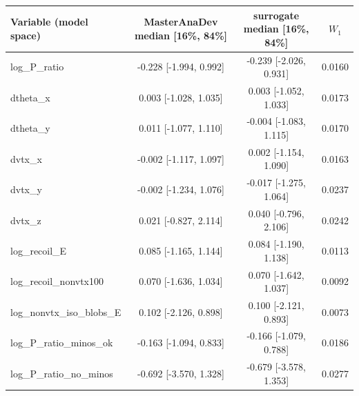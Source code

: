 \begin{tabular}{lccc}
\toprule
Variable (model space) & MasterAnaDev median [16\%, 84\%] & surrogate median [16\%, 84\%] & $W_1$ \\
\midrule
log\_P\_ratio & -0.228 [-1.994, 0.992] & -0.239 [-2.026, 0.931] & 0.0160 \\
dtheta\_x & 0.003 [-1.028, 1.035] & 0.003 [-1.052, 1.033] & 0.0173 \\
dtheta\_y & 0.011 [-1.077, 1.110] & -0.004 [-1.083, 1.115] & 0.0170 \\
dvtx\_x & -0.002 [-1.117, 1.097] & 0.002 [-1.154, 1.090] & 0.0163 \\
dvtx\_y & -0.002 [-1.234, 1.076] & -0.017 [-1.275, 1.064] & 0.0237 \\
dvtx\_z & 0.021 [-0.827, 2.114] & 0.040 [-0.796, 2.106] & 0.0242 \\
log\_recoil\_E & 0.085 [-1.165, 1.144] & 0.084 [-1.190, 1.138] & 0.0113 \\
log\_recoil\_nonvtx100 & 0.070 [-1.636, 1.034] & 0.070 [-1.642, 1.037] & 0.0092 \\
log\_nonvtx\_iso\_blobs\_E & 0.102 [-2.126, 0.898] & 0.100 [-2.121, 0.893] & 0.0073 \\
log\_P\_ratio\_minos\_ok & -0.163 [-1.094, 0.833] & -0.166 [-1.079, 0.788] & 0.0186 \\
log\_P\_ratio\_no\_minos & -0.692 [-3.570, 1.328] & -0.679 [-3.578, 1.353] & 0.0277 \\
\bottomrule
\end{tabular}
